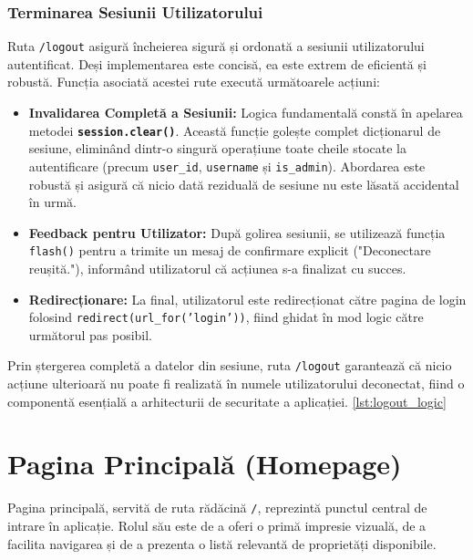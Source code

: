 \documentclass[12pt, a4paper, oneside, romanian]{teza-upb}
\begin{document}
\subsubsection*{Terminarea Sesiunii Utilizatorului}
Ruta \texttt{/logout} asigură încheierea sigură și ordonată a sesiunii utilizatorului autentificat. Deși implementarea este concisă, ea este extrem de eficientă și robustă. Funcția asociată acestei rute execută următoarele acțiuni:

\begin{itemize}
	\item \textbf{Invalidarea Completă a Sesiunii:} Logica fundamentală constă în apelarea metodei \textbf{\texttt{session.clear()}}. Această funcție golește complet dicționarul de sesiune, eliminând dintr-o singură operațiune toate cheile stocate la autentificare (precum \texttt{user\_id}, \texttt{username} și \texttt{is\_admin}). Abordarea este robustă și asigură că nicio dată reziduală de sesiune nu este lăsată accidental în urmă.
	
	\item \textbf{Feedback pentru Utilizator:} După golirea sesiunii, se utilizează funcția \texttt{flash()} pentru a trimite un mesaj de confirmare explicit ("Deconectare reușită."), informând utilizatorul că acțiunea s-a finalizat cu succes.
	
	\item \textbf{Redirecționare:} La final, utilizatorul este redirecționat către pagina de login folosind \texttt{redirect(url\_for('login'))}, fiind ghidat în mod logic către următorul pas posibil.
\end{itemize}

Prin ștergerea completă a datelor din sesiune, ruta \texttt{/logout} garantează că nicio acțiune ulterioară nu poate fi realizată în numele utilizatorului deconectat, fiind o componentă esențială a arhitecturii de securitate a aplicației. \ref {lst:logout_logic}





\section{Pagina Principală (Homepage)}
Pagina principală, servită de ruta rădăcină \texttt{/}, reprezintă punctul central de intrare în aplicație. Rolul său este de a oferi o primă impresie vizuală, de a facilita navigarea și de a prezenta o listă relevantă de proprietăți disponibile.
\end{document}
